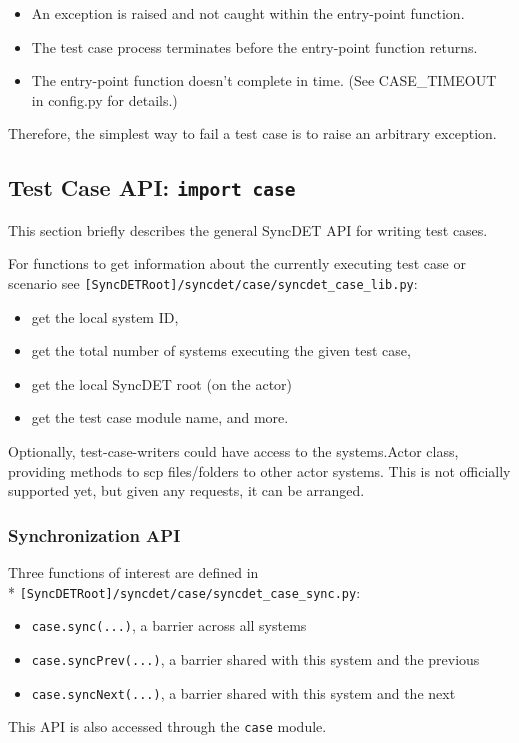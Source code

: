 \begin{itemize}
\item An exception is raised and not caught within the entry-point function.
\item The test case process terminates before the entry-point function returns.
\item The entry-point function doesn't complete in time. (See CASE\_TIMEOUT
in config.py for details.)
\end{itemize}

Therefore, the simplest way to fail a test case is to raise an arbitrary exception.

\subsection{Test Case API: {\tt import case}} 

This section briefly describes the general SyncDET API for writing test cases.
 
For functions to get information about the currently executing test case or
scenario see {\tt [SyncDETRoot]/syncdet/case/syncdet\_case\_lib.py}:
\begin{itemize}
\item get the local system ID, 
\item get the total number of systems executing the given test case, 
\item get the local SyncDET root (on the actor)
\item get the test case module name, and more.
\end{itemize}

Optionally, test-case-writers could have access to the systems.Actor class,
providing methods to scp files/folders to other actor systems. This is not
officially supported yet, but given any requests, it can be arranged.

\subsubsection{Synchronization API}

Three functions of interest are defined in \\*
{\tt [SyncDETRoot]/syncdet/case/syncdet\_case\_sync.py}:
\begin{itemize}
\item {\tt case.sync(...)}, a barrier across all systems
\item {\tt case.syncPrev(...)}, a barrier shared with this system and the previous
\item {\tt case.syncNext(...)}, a barrier shared with this system and the next
\end{itemize}
This API is also accessed through the {\tt case} module.


